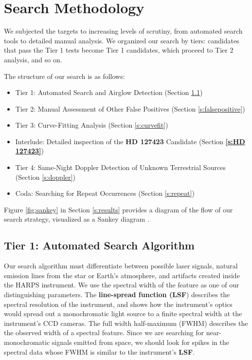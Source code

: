 \documentclass[linenumbers]{aastex701}
\providecommand{\DIFadd}[1]{{\bf #1}} %
\providecommand{\DIFaddbegin}{} %
\providecommand{\DIFaddend}{} %
\begin{document}
\section{Search Methodology}
We subjected the targets to increasing levels of scrutiny, from automated search tools to detailed manual analysis.  We organized our search by tiers: candidates that pass the Tier 1 tests become Tier 1 candidates, which proceed to Tier 2 analysis, and so on.

The structure of our search is as follows:
\begin{itemize}
    \item Tier 1: Automated Search and Airglow Detection (Section \ref{s:automated})
    \item Tier 2: Manual Assessment of Other False Positives (Section \ref{s:falsepositive})
    \item Tier 3: Curve-Fitting Analysis (Section \ref{s:curvefit})
    \item Interlude: Detailed inspection of the  \DIFaddbegin \DIFadd{HD 127423 }\DIFaddend Candidate (Section  \DIFaddbegin \DIFadd{\ref{s:HD 127423}}\DIFaddend )
    \item Tier 4: Same-Night Doppler Detection of Unknown Terrestrial Sources (Section \ref{s:doppler})
    \item Coda: Searching for Repeat Occurrences (Section \ref{s:repeat})
\end{itemize}

Figure \ref{fig:sankey} in Section \ref{s:results} provides a diagram of the flow of our search strategy, visualized as a Sankey diagram \citep{sankey1898}.

\subsection{Tier  1: Automated Search Algorithm}
\label{s:automated}
Our search algorithm must differentiate between possible laser signals, natural emission lines from the star or Earth's atmosphere, and artifacts created inside the HARPS instrument. We use the spectral width of the feature as one of our distinguishing parameters. The  \DIFaddbegin \DIFadd{line-spread function (LSF}\DIFaddend ) describes the spectral resolution of the instrument, and shows how the instrument's optics would spread out a monochromatic light source to a finite spectral width at the instrument's CCD cameras. The full width half-maximum (FWHM) describes the the observed width of a spectral feature. Since we are searching for near-monochromatic signals emitted from space, we should look for spikes in the spectral data whose FWHM is similar to the instrument's  \DIFaddbegin \DIFadd{LSF}\DIFaddend .
\end{document}
